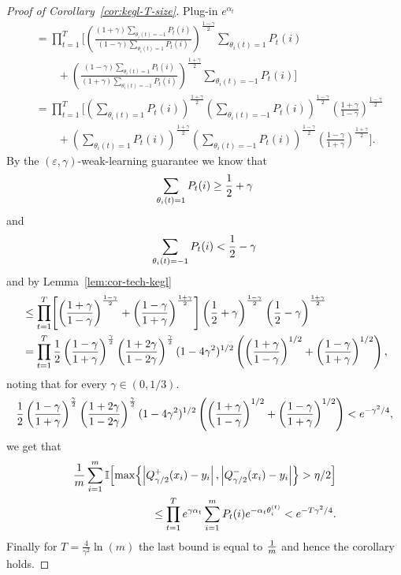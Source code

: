 \documentclass[12pt,a4paper,oneside,onecolumn]{book}
\begin{document}
\begin{proof}[Proof of Corollary~\ref{cor:kegl-T-size}]
  Plug-in $e^{\alpha_t}$ 
  \begin{align*}
    &= \prod_{t=1}^T 
    \Biggl[
    \left(
    \frac{(1+\gamma)\sum_{\theta_i(t)=-1}P_t(i)}
    {(1-\gamma)\sum_{\theta_i(t)=1}P_t(i)}
    \right)^{\frac{1-\gamma}{2}} 
    \sum_{\theta_i(t)=1} P_t(i) \\
    &\qquad+
    \left(
    \frac{(1-\gamma)\sum_{\theta_i(t)=1}P_t(i)}
    {(1+\gamma)\sum_{\theta_i(t)=-1}P_t(i)}
    \right)^{\frac{1+\gamma}{2}}
    \sum_{\theta_i(t)=-1} P_t(i)
    \Biggr]\\
    &=
    \prod_{t=1}^T 
    \Biggl[
    \left(\sum_{\theta_i(t)=1}P_t(i)\right)^{\frac{1+\gamma}{2}}
    \left(\sum_{\theta_i(t)=-1}P_t(i)\right)^{\frac{1-\gamma}{2}}
    \left(\frac{1+\gamma}{1-\gamma}\right)^{\frac{1-\gamma}{2}} \\
    &\qquad+
    \left(\sum_{\theta_i(t)=1}P_t(i)\right)^{\frac{1+\gamma}{2}}
    \left(\sum_{\theta_i(t)=-1}P_t(i)\right)^{\frac{1-\gamma}{2}}
    \left(\frac{1-\gamma}{1+\gamma}\right)^{\frac{1+\gamma}{2}}
    \Biggr].
  \end{align*}
  By the $(\varepsilon,\gamma)$-weak-learning guarantee
  we know that
  $$\sum_{\theta_i(t)=1}P_t(i) \geq \frac{1}{2} + \gamma$$
  and
  $$\sum_{\theta_i(t)=-1}P_t(i) < \frac{1}{2} - \gamma$$  
  and by Lemma~\ref{lem:cor-tech-kegl}
  \begin{align*}
    &\leq \prod_{t=1}^T 
    \Biggl[
    \left(\frac{1+\gamma}{1-\gamma}\right)^{\frac{1-\gamma}{2}}
    +
    \left(\frac{1-\gamma}{1+\gamma}\right)^{\frac{1+\gamma}{2}}
    \Biggr]
    \left(\frac{1}{2} + \gamma\right)^{\frac{1-\gamma}{2}}
    \left(\frac{1}{2} - \gamma\right)^{\frac{1+\gamma}{2}}\\
    &=
    \prod_{t=1}^T 
    \frac{1}{2}
    \left(\frac{1-\gamma}{1+\gamma}\right)^{\frac{\gamma}{2}}
    \left(\frac{1+2\gamma}{1-2\gamma}\right)^{\frac{\gamma}{2}}
    (1 - 4\gamma^2)^{1/2}
    \left(
    \left(\frac{1+\gamma}{1-\gamma}\right)^{1/2}
    +
    \left(\frac{1-\gamma}{1+\gamma}\right)^{1/2}
    \right),
  \end{align*}
  noting that for every
  $\gamma \in (0,1/3)$.
  \[
    \frac{1}{2}
    \left(\frac{1-\gamma}{1+\gamma}\right)^{\frac{\gamma}{2}}
    \left(\frac{1+2\gamma}{1-2\gamma}\right)^{\frac{\gamma}{2}}
    (1 - 4\gamma^2)^{1/2}
    \left(
      \left(\frac{1+\gamma}{1-\gamma}\right)^{1/2}
      +
      \left(\frac{1-\gamma}{1+\gamma}\right)^{1/2}
    \right)
    <
    e^{-\gamma^2/4},
  \]
  we get that
  \begin{align*}
    \frac{1}{m} \sum_{i=1}^{m} \mathbb{I}\!\left[ \max\!\left\{ \left| Q_{\gamma/2}^{+}(x_{i}) - y_{i} \right|, \left| Q_{\gamma/2}^{-}(x_{i}) - y_{i} \right| \right\} > \eta/2 \right] \\
    \leq \prod_{t=1}^{T} e^{\gamma \alpha_{t}} \sum_{i=1}^{m} P_{t}(i) e^{-\alpha_{t} \theta_{i}^{(t)}}
    <
    e^{-T\gamma^2/4}    .
  \end{align*}
  Finally for
  $T = \frac{4}{\gamma^2}\ln(m)$
  the last bound is equal to
  $\frac{1}{m}$
  and hence the corollary holds.
\end{proof}
    
\end{document}
